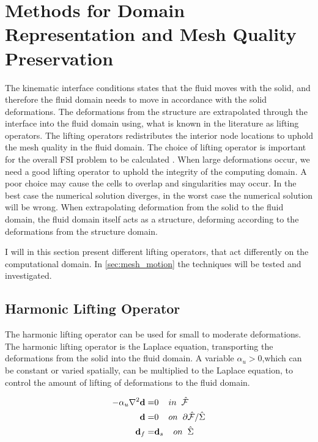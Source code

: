 \section{Methods for Domain Representation and Mesh Quality Preservation} \label{sec:meshmotion}
The kinematic interface conditions states that the fluid moves with the solid, and therefore the fluid domain needs to move in accordance with the solid deformations. The deformations from the structure are extrapolated through the interface into the fluid domain using, what is known in the literature as lifting operators. The lifting operators redistributes the interior node locations to uphold the mesh quality in the fluid domain.
The choice of lifting operator is important for the overall FSI problem to be calculated \cite{Wick2011a}. When large deformations occur, we need a good lifting operator to uphold the integrity of the computing domain. A poor choice may cause the cells to overlap and singularities may occur. In the best case the numerical solution diverges, in the worst case the numerical solution will be wrong.
When extrapolating deformation from the solid to the fluid domain, the fluid domain itself acts as a structure, deforming according to the deformations from the structure domain.\newline

I will in this section present different lifting operators, that act differently on the computational domain. In \ref{sec:mesh_motion} the techniques will be tested and investigated.

\subsection{Harmonic Lifting Operator}
The harmonic lifting operator can be used for small to moderate deformations. The harmonic lifting operator is the Laplace equation, transporting the deformations from the solid into the fluid domain. A variable $\alpha_u > 0$,which can be constant or varied spatially, can be multiplied to the Laplace equation, to control the amount of lifting of deformations to the fluid domain.

\begin{align}
 - \alpha_u \nabla^2 \bold{d} =& 0\hspace{4mm} in \hspace{2mm} \hat{\mathcal{F}}\\
  \hspace{4mm} \bold{d} =& 0 \hspace{4mm } on \hspace{2mm }  \partial \hat{\mathcal{F}} / \hat{\Sigma} \\
  \bold{d}_f =& \bold{d}_s \hspace{4mm } on \hspace{2mm } \hat{\Sigma} 
\end{align}

